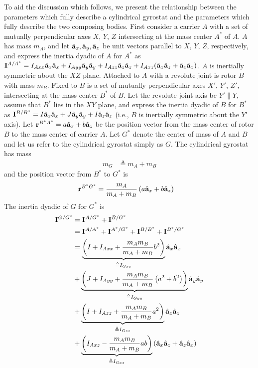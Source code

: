 To aid the discussion which follows, we present the relationship between the
parameters which fully describe a cylindrical gyrostat and the parameters which
fully describe the two composing bodies. First consider a carrier $A$ with a
set of mutually perpendicular axes $X$, $Y$, $Z$ intersecting at the mass
center $A^*$ of $A$. $A$ has mass $m_A$, and let $\hat{\mathbf{a}}_{x}, \hat{\mathbf{a}}_{y},
\hat{\mathbf{a}}_{z}$ be unit vectors parallel to $X$, $Y$, $Z$, respectively, and express
the inertia dyadic of $A$ for $A^*$ as $\mathbf{I}^{A/A^*} =
I_{Axx}\hat{\mathbf{a}}_{x}\hat{\mathbf{a}}_{x} + I_{Ayy}\hat{\mathbf{a}}_{y}\hat{\mathbf{a}}_{y} +
I_{Azz}\hat{\mathbf{a}}_{z}\hat{\mathbf{a}}_{z} + I_{Axz}(\hat{\mathbf{a}}_{x}\hat{\mathbf{a}}_{z} + \hat{\mathbf{a}}_{z}\hat{\mathbf{a}}_{x})$.
$A$ is inertially symmetric about the $XZ$ plane. Attached to $A$ with a
revolute joint is rotor $B$ with mass $m_B$. Fixed to $B$ is a set of
mutually perpendicular axes $X'$, $Y'$, $Z'$, intersecting at the mass center
$B^*$ of $B$. Let the revolute joint axis be $Y'\parallel Y$, assume that $B^*$
lies in the $XY$ plane, and express the inertia dyadic of $B$ for $B^*$ as
$\mathbf{I}^{B/B^*} = I\hat{\mathbf{a}}_{x}\hat{\mathbf{a}}_{x} + J\hat{\mathbf{a}}_{y}\hat{\mathbf{a}}_{y} +
I\hat{\mathbf{a}}_{z}\hat{\mathbf{a}}_{z}$ (i.e., $B$ is inertially symmetric about the $Y'$ axis).
Let $\mathbf{r}^{B^*A^*} = a \hat{\mathbf{a}}_{x} + b \hat{\mathbf{a}}_{z}$ be the position vector
from the mass center of rotor $B$ to the mass center of carrier $A$.  Let $G^*$
denote the center of mass of $A$ and $B$ and let us refer to the cylindrical
gyrostat simply as $G$. The cylindrical gyrostat has mass
\begin{align}
  m_G &\triangleq m_A + m_B
\end{align}
and the position vector from $B^*$ to $G^*$ is
\begin{align}
  \mathbf{r}^{B^*G^*} &= \frac{m_A}{m_A + m_B}\left(a \hat{\mathbf{a}}_{x} + b \hat{\mathbf{a}}_{z}\right)
\end{align}
The inertia dyadic of $G$ for $G^*$ is
\begin{align}
  \bm{I}^{G/G^*} &= \bm{I}^{A/G^*} + \bm{I}^{B/G^*} \notag \\
                 &= \bm{I}^{A/A^*} + \bm{I}^{A^*/G^*} + \bm{I}^{B/B^*} +
                 \bm{I}^{B^*/G^*} \notag \\
%
                 &= \underbrace{\left(I + I_{Axx} + \frac{m_A m_B}{m_A + m_B}
               b^2 \right)}_{\triangleq I_{Gxx}}
                 \uv{a}{x}\uv{a}{x} \notag \\
%
                 &+ \underbrace{\left(J + I_{Ayy} + \frac{m_A m_B}{m_A + m_B} \left(a^2 +
               b^2\right)\right)}_{\triangleq I_{Gyy}} \uv{a}{y}\uv{a}{y} \notag \\
%
                 &+ \underbrace{\left(I + I_{Azz} + \frac{m_A m_B}{m_A + m_B}
               a^2 \right)}_{\triangleq I_{Gzz}}
                 \uv{a}{z}\uv{a}{z} \notag \\
%
                 &+ \underbrace{\left(I_{Axz} - \frac{m_A m_B}{m_A + m_B} a b
               \right)}_{\triangleq I_{Gxz}}
               \left(\uv{a}{x}\uv{a}{z} + \uv{a}{z}\uv{a}{x}\right)
\end{align}
